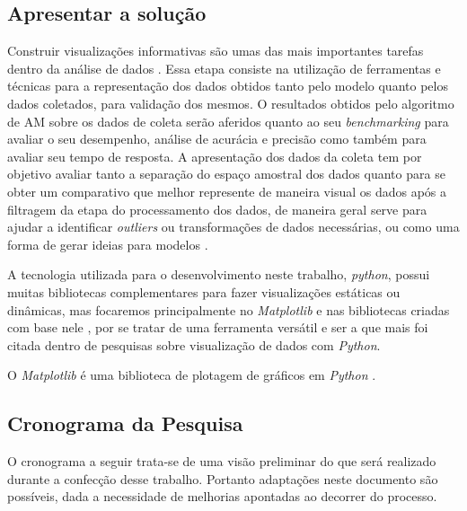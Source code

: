 \subsection{Apresentar a solução}
Construir visualizações informativas são umas das mais importantes tarefas dentro da análise de dados \cite{McKinney2012datapython}. Essa etapa consiste na utilização de ferramentas e técnicas para a representação dos dados obtidos tanto pelo modelo quanto pelos dados coletados, para validação dos mesmos. O resultados obtidos pelo algoritmo de AM sobre os dados de coleta serão aferidos quanto ao seu \textit{benchmarking} \cite{Benchmarking} para avaliar o seu desempenho, análise de acurácia e precisão como também para avaliar seu tempo de resposta. A apresentação dos dados da coleta tem por objetivo avaliar tanto a separação do espaço amostral dos dados quanto para se obter um comparativo que melhor represente de maneira visual os dados após a filtragem da etapa do processamento dos dados, de maneira geral serve para ajudar a identificar \textit{outliers} ou transformações de dados necessárias, ou como uma forma de gerar ideias para modelos \cite{McKinney2012datapython}.

A tecnologia utilizada para o desenvolvimento neste trabalho, \textit{python}, possui muitas bibliotecas complementares para fazer visualizações estáticas ou dinâmicas, mas focaremos principalmente no \textit{Matplotlib} e nas bibliotecas criadas com base nele \cite{McKinney2012datapython}, por se tratar de uma ferramenta versátil e ser a que mais foi citada dentro de pesquisas sobre visualização de dados com \textit{Python}.

O \textit{Matplotlib} é uma biblioteca de plotagem de gráficos em \textit{Python} \cite{Matplotlib}.

\subsection{Cronograma da Pesquisa}

O cronograma a seguir trata-se de uma visão preliminar do que será realizado durante a confecção desse trabalho. Portanto adaptações neste documento são possíveis, dada a necessidade de melhorias apontadas ao decorrer do processo.

